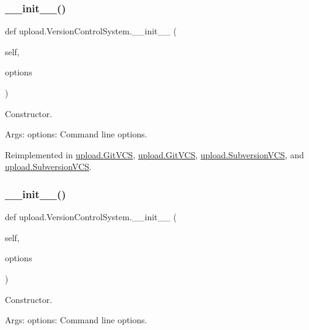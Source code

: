 \subsubsection{\texorpdfstring{\_\_init\_\_()}{\_\_init\_\_()}\hspace{0.1cm}{\footnotesize\ttfamily [1/2]}}
{\footnotesize\ttfamily def upload.\+Version\+Control\+System.\+\_\+\+\_\+init\+\_\+\+\_\+ (\begin{DoxyParamCaption}\item[{}]{self,  }\item[{}]{options }\end{DoxyParamCaption})}

\begin{DoxyVerb}Constructor.

Args:
  options: Command line options.
\end{DoxyVerb}
 

Reimplemented in \mbox{\hyperlink{classupload_1_1_git_v_c_s_aba4e1dca1c4b3e5db7ba07f6bce3c839}{upload.\+Git\+V\+CS}}, \mbox{\hyperlink{classupload_1_1_git_v_c_s_aba4e1dca1c4b3e5db7ba07f6bce3c839}{upload.\+Git\+V\+CS}}, \mbox{\hyperlink{classupload_1_1_subversion_v_c_s_a8333f94e27335ce83eed0cc3f5a1eeb0}{upload.\+Subversion\+V\+CS}}, and \mbox{\hyperlink{classupload_1_1_subversion_v_c_s_a8333f94e27335ce83eed0cc3f5a1eeb0}{upload.\+Subversion\+V\+CS}}.

\mbox{\label{classupload_1_1_version_control_system_ace97e5785a2b40011404ae6fbb956ecf}} 
\subsubsection{\texorpdfstring{\_\_init\_\_()}{\_\_init\_\_()}\hspace{0.1cm}{\footnotesize\ttfamily [2/2]}}
{\footnotesize\ttfamily def upload.\+Version\+Control\+System.\+\_\+\+\_\+init\+\_\+\+\_\+ (\begin{DoxyParamCaption}\item[{}]{self,  }\item[{}]{options }\end{DoxyParamCaption})}

\begin{DoxyVerb}Constructor.

Args:
  options: Command line options.
\end{DoxyVerb}
 

